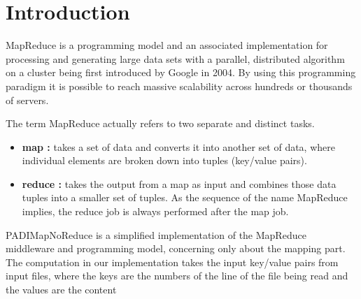 \section{Introduction}

MapReduce is a programming model and an associated implementation for processing and generating large data sets with a parallel, distributed algorithm on a cluster being first introduced by Google in 2004. 
By using this programming paradigm it is possible to reach massive scalability across hundreds or thousands of servers.



The term MapReduce actually refers to two separate and distinct tasks. 
\begin{itemize}
\item \textbf{map :} takes a set of data and converts it into another set of data, where individual elements are broken down into tuples (key/value pairs).
\item \textbf{reduce :} takes the output from a map as input and combines those data tuples into a smaller set of tuples. As the sequence of the name MapReduce implies, the reduce job is always performed after the map job.
\end{itemize}


PADIMapNoReduce is a simplified implementation of the MapReduce middleware and programming model, concerning only about the mapping part.
The computation in our implementation takes the input key/value pairs from input files, where the keys are the numbers of the line of the file being read and the values are the content









